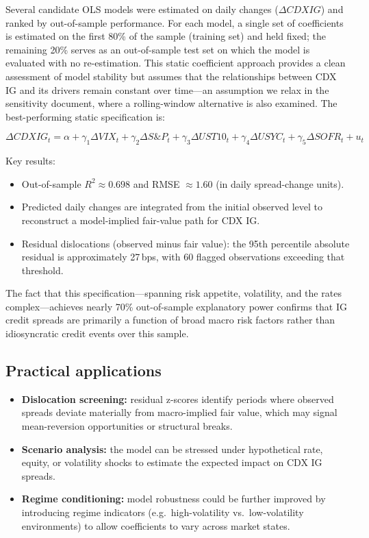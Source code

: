 Several candidate OLS models were estimated on daily changes
(\(\Delta CDXIG\)) and ranked by out-of-sample performance. For each model, a
single set of coefficients is estimated on the first 80\% of the sample
(training set) and held fixed; the remaining 20\% serves as an out-of-sample
test set on which the model is evaluated with no re-estimation. This static
coefficient approach provides a clean assessment of model stability but assumes
that the relationships between CDX IG and its drivers remain constant over
time---an assumption we relax in the sensitivity document, where a
rolling-window alternative is also examined. The best-performing static
specification is:

\[
\Delta CDXIG_t = \alpha + \gamma_1 \Delta VIX_t + \gamma_2 \Delta S\&P_t
  + \gamma_3 \Delta UST10_t + \gamma_4 \Delta USYC_t
  + \gamma_5 \Delta SOFR_t + u_t
\]

Key results:
\begin{itemize}
  \item Out-of-sample \(R^2 \approx 0.698\) and RMSE \(\approx 1.60\) (in
    daily spread-change units).
  \item Predicted daily changes are integrated from the initial observed level
    to reconstruct a model-implied fair-value path for CDX IG.
  \item Residual dislocations (observed minus fair value): the 95th percentile
    absolute residual is approximately 27\,bps, with 60 flagged observations
    exceeding that threshold.
\end{itemize}

The fact that this specification---spanning risk appetite, volatility, and the
rates complex---achieves nearly 70\% out-of-sample explanatory power confirms
that IG credit spreads are primarily a function of broad macro risk factors
rather than idiosyncratic credit events over this sample.

\subsection*{Practical applications}

\begin{itemize}
  \item \textbf{Dislocation screening:} residual z-scores identify periods
    where observed spreads deviate materially from macro-implied fair value,
    which may signal mean-reversion opportunities or structural breaks.
  \item \textbf{Scenario analysis:} the model can be stressed under
    hypothetical rate, equity, or volatility shocks to estimate the expected
    impact on CDX IG spreads.
  \item \textbf{Regime conditioning:} model robustness could be further
    improved by introducing regime indicators (e.g.\ high-volatility vs.\
    low-volatility environments) to allow coefficients to vary across market
    states.
\end{itemize}

